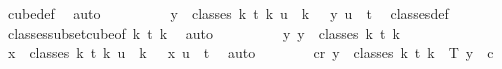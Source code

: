 \begin{isabellebody}
\ cube{\isacharunderscore}{\kern0pt}def\ \isamarkupfalse%
\ auto\isanewline
\ \ \ \ \ \ \isamarkupfalse%
\ \isamarkupfalse%
\ {\isachardoublequoteopen}{\isasymexists}{\isacharbang}{\kern0pt}y\ {\isasymin}\ classes\ {\isacharparenleft}{\kern0pt}k{\isacharplus}{\kern0pt}{}{\isacharparenright}{\kern0pt}\ t\ {\isacharparenleft}{\kern0pt}k{\isacharplus}{\kern0pt}{}{\isacharparenright}{\kern0pt}{\isachardot}{\kern0pt}\ {\isacharparenleft}{\kern0pt}{\isasymforall}u\ {\isacharless}{\kern0pt}\ k\ {\isacharplus}{\kern0pt}\ {}{\isachardot}{\kern0pt}\ y\ u\ {\isacharequal}{\kern0pt}\ t{\isacharparenright}{\kern0pt}{\isachardoublequoteclose}\ \isamarkupfalse%
\ classes{\isacharunderscore}{\kern0pt}def\ \isamarkupfalse%
\ classes{\isacharunderscore}{\kern0pt}subset{\isacharunderscore}{\kern0pt}cube{\isacharbrackleft}{\kern0pt}of\ {\isachardoublequoteopen}k{\isacharplus}{\kern0pt}{}{\isachardoublequoteclose}\ t\ {\isachardoublequoteopen}k{\isacharplus}{\kern0pt}{}{\isachardoublequoteclose}{\isacharbrackright}{\kern0pt}\ \isamarkupfalse%
\ auto\isanewline
\ \ \ \ \ \ \isamarkupfalse%
\ \isamarkupfalse%
\ {\isachardoublequoteopen}{\isasymexists}{\isacharbang}{\kern0pt}y{\isachardot}{\kern0pt}\ y\ {\isasymin}\ classes\ {\isacharparenleft}{\kern0pt}k{\isacharplus}{\kern0pt}{}{\isacharparenright}{\kern0pt}\ t\ {\isacharparenleft}{\kern0pt}k{\isacharplus}{\kern0pt}{}{\isacharparenright}{\kern0pt}{\isachardoublequoteclose}\ \isamarkupfalse%
\ {\isacartoucheopen}{\isasymforall}x\ {\isasymin}\ classes\ {\isacharparenleft}{\kern0pt}k{\isacharplus}{\kern0pt}{}{\isacharparenright}{\kern0pt}\ t\ {\isacharparenleft}{\kern0pt}k{\isacharplus}{\kern0pt}{}{\isacharparenright}{\kern0pt}{\isachardot}{\kern0pt}\ {\isasymforall}u\ {\isacharless}{\kern0pt}\ k\ {\isacharplus}{\kern0pt}\ {}{\isachardot}{\kern0pt}\ x\ u\ {\isacharequal}{\kern0pt}\ t{\isacartoucheclose}\ \isamarkupfalse%
\ auto\isanewline
\ \ \ \ \ \ \isamarkupfalse%
\ {\isachardoublequoteopen}{\isasymexists}c{\isacharless}{\kern0pt}r{\isachardot}{\kern0pt}\ {\isasymforall}y\ {\isasymin}\ classes\ {\isacharparenleft}{\kern0pt}k{\isacharplus}{\kern0pt}{}{\isacharparenright}{\kern0pt}\ t\ {\isacharparenleft}{\kern0pt}k{\isacharplus}{\kern0pt}{}{\isacharparenright}{\kern0pt}{\isachardot}{\kern0pt}\ {\isasymchi}\ {\isacharparenleft}{\kern0pt}T\ y{\isacharparenright}{\kern0pt}\ {\isacharequal}{\kern0pt}\ c{\isachardoublequoteclose}\ \isanewline

\end{isabellebody}
